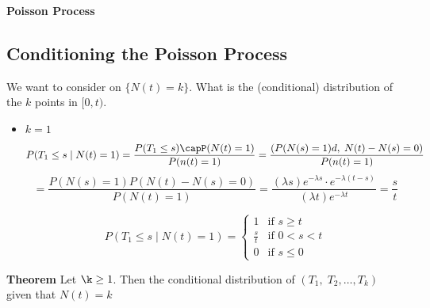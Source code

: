\documentclass[12pt]{article}
\begin{document}
\begin{section}{\bf Poisson Process}
\subsection{Conditioning the Poisson Process}
We want to consider on $\{N(t)=k\}.$ What is the (conditional) distribution of the $k$ points in $[0,t)$.
\begin{itemize}
    \item $k=1$
    $$P(T_1\le s\;|\;N(t)=1) = \frac{P(T_1\le s)\capP(N(t)=1)}{P(n(t)=1)} = \frac{(P(N(s)=1)d,\;N(t)-N(s)=0)}{P(n(t)=1)} $$ $$=\frac{P(N(s)=1)P(N(t)-N(s)=0)}{P(N(t)=1)}
    =\frac{(\lambda s)e^{-\lambda s}\cdot e^{-\lambda(t-s)}}{(\lambda t)e^{-\lambda t}} = \frac{s}{t}$$
    
    $$
    P(T_1\le s\;|\;N(t)=1)= 
    \begin{cases}
        1 & \text{if } s \ge t\\
        \frac{s}{t} &  \text{if } 0< s < t\\
        0 & \text{if } s \le 0
    \end{cases}$$

\end{itemize}

{\bf Theorem} Let $\k\ge 1$. Then the conditional distribution of $(T_1,\;T_2,\ldots,T_k)$ given that $N(t) = k$
\end{section}
\end{document}
